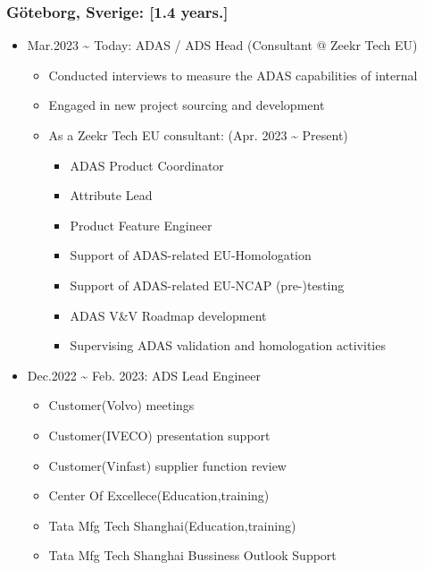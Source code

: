 \documentclass[12pt,a4paper]{article}
\begin{document}
\subsubsection{Göteborg, Sverige: [1.4 years.]}
\begin{itemize}
\item Mar.2023 {\textasciitilde} Today: ADAS / ADS Head (Consultant @ Zeekr Tech EU)

\begin{itemize}
\item Conducted interviews to measure the ADAS capabilities of internal


\item Engaged in new project sourcing and development 


\item As a Zeekr Tech EU consultant: (Apr. 2023 {\textasciitilde} Present)

\begin{itemize}
\item ADAS Product Coordinator 


\item Attribute Lead 


\item Product Feature Engineer 


\item Support of ADAS-related EU-Homologation


\item Support of ADAS-related EU-NCAP (pre-)testing


\item ADAS V\&V Roadmap development


\item Supervising ADAS validation and homologation activities

\end{itemize}
\end{itemize}

\item Dec.2022 {\textasciitilde} Feb. 2023: ADS Lead Engineer 

\begin{itemize}
\item Customer(Volvo) meetings


\item Customer(IVECO) presentation support


\item Customer(Vinfast) supplier function review


\item Center Of Excellece(Education,training)


\item Tata Mfg Tech Shanghai(Education,training)


\item Tata Mfg Tech Shanghai Bussiness Outlook Support

\end{itemize}
\end{itemize}
\end{document}
